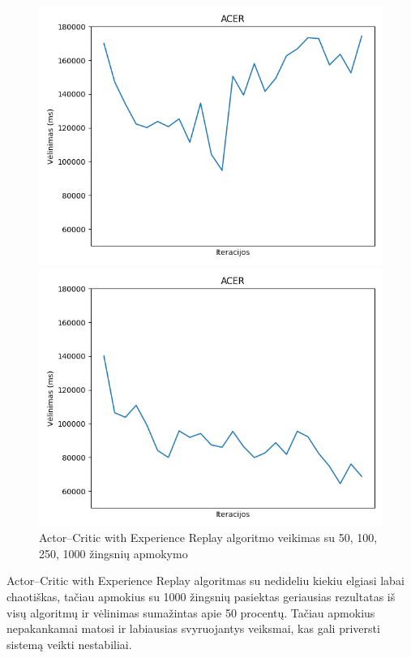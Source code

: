 \documentclass{VUMIFPSbakalaurinis}
\begin{document}
\begin{figure}[H]
\begin{minipage}[b]{0.4\textwidth}
        \includegraphics[width=\textwidth]{img/acer_250_2.png}
    \end{minipage}
    \hspace{1mm}
    \begin{minipage}[b]{0.4\textwidth}
        \includegraphics[width=\textwidth]{img/acer_1000_2.png}
    \end{minipage}
    \caption{Actor–Critic with Experience Replay algoritmo veikimas su 50, 100, 250, 1000 žingsnių apmokymo}
\end{figure}
Actor–Critic with Experience Replay algoritmas su nedideliu kiekiu elgiasi labai chaotiškas, tačiau apmokius su 1000 žingsnių pasiektas geriausias rezultatas iš visų algoritmų ir vėlinimas sumažintas apie 50 procentų. Tačiau apmokius nepakankamai matosi ir labiausias svyruojantys veiksmai, kas gali priversti sistemą veikti nestabiliai. 
\end{document}
